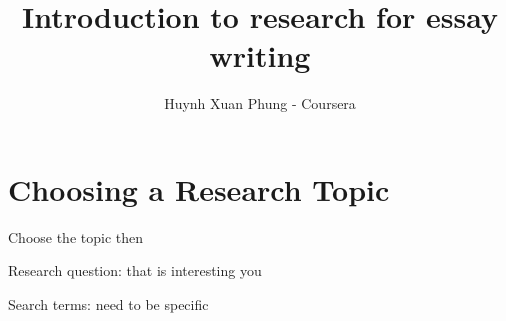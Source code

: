 \documentclass{article}
\title{Introduction to research for essay writing}
\author{Huynh Xuan Phung - Coursera}
\date{ }
\begin{document}
 
\maketitle
 
\tableofcontents

\section{Choosing a Research Topic}
Choose the topic then

Research question: that is interesting you

Search terms: need to be specific




 

 
\end{document}
